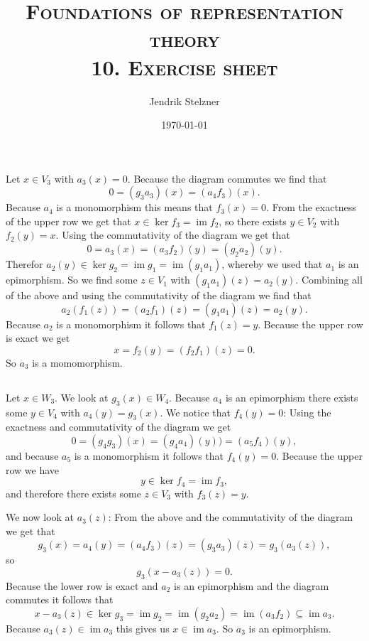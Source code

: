 \documentclass[a4paper,10pt]{article}
\title{\textsc{Foundations of representation theory \\ \Large 10. Exercise sheet}}
\author{Jendrik Stelzner}
\date{\today}
\theoremstyle{definition}
\newcommand{\img}{\operatorname{im}}
\begin{document}
\maketitle





\addtocounter{section}{1}




\section{}


\subsection{}
Let $x \in V_3$ with $a_3(x) = 0$. Because the diagram commutes we find that
\[
 0 = (g_3 a_3)(x) = (a_4 f_3)(x).
\]
Because $a_4$ is a monomorphism this means that $f_3(x) = 0$. From the exactness of the upper row we get that $x \in \ker f_3 = \img f_2$, so there exists $y \in V_2$ with $f_2(y) = x$. Using the commutativity of the diagram we get that
\[
 0 = a_3(x) = (a_3 f_2)(y) = (g_2 a_2)(y).
\]
Therefor $a_2(y) \in \ker g_2 = \img g_1 = \img (g_1 a_1)$, whereby we used that $a_1$ is an epimorphism. So we find some $z \in V_1$ with $(g_1 a_1)(z) = a_2(y)$. Combining all of the above and using the commutativity of the diagram we find that
\[
 a_2( f_1(z) ) = (a_2 f_1)(z) = (g_1 a_1)(z) = a_2(y).
\]
Because $a_2$ is a monomorphism it follows that $f_1(z) = y$. Because the upper row is exact we get
\[
 x = f_2(y) = (f_2 f_1)(z) = 0.
\]
So $a_3$ is a momomorphism.


\subsection{}
Let $x \in W_3$. We look at $g_3(x) \in W_4$. Because $a_4$ is an epimorphism there exists some $y \in V_4$ with $a_4(y) = g_3(x)$. We notice that $f_4(y) = 0$: Using the exactness and commutativity of the diagram we get
\[
 0 = (g_4 g_3)(x) = (g_4 a_4)(y) ) = (a_5 f_4)(y),
\]
and because $a_5$ is a monomorphism it follows that $f_4(y) = 0$. Because the upper row we have
\[
 y \in \ker f_4 = \img f_3,
\]
and therefore there exists some $z \in V_3$ with $f_3(z) = y$.

We now look at $a_3(z)$: From the above and the commutativity of the diagram we get that
\[
 g_3(x) = a_4(y) = (a_4 f_3)(z) = (g_3 a_3)(z) = g_3( a_3(z) ),
\]
so
\[
 g_3( x-a_3(z) ) = 0.
\]
Because the lower row is exact and $a_2$ is an epimorphism and the diagram commutes it follows that
\[
 x - a_3(z) \in \ker g_3 = \img g_2 = \img (g_2 a_2) = \img (a_3 f_2) \subseteq \img a_3.
\]
Because $a_3(z) \in \img a_3$ this gives us $x \in \img a_3$. So $a_3$ is an epimorphism.
\end{document}
